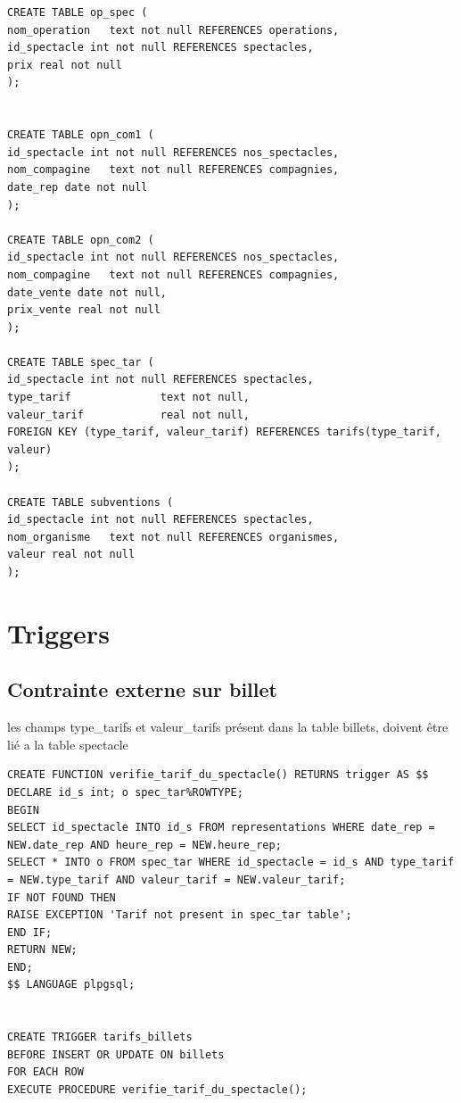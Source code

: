 \documentclass[10pt]{report}
\begin{document}
\begin{lstlisting}
CREATE TABLE op_spec (
nom_operation   text not null REFERENCES operations,
id_spectacle int not null REFERENCES spectacles,
prix real not null
);


CREATE TABLE opn_com1 (
id_spectacle int not null REFERENCES nos_spectacles,
nom_compagine   text not null REFERENCES compagnies,
date_rep date not null
);

CREATE TABLE opn_com2 (
id_spectacle int not null REFERENCES nos_spectacles,
nom_compagine   text not null REFERENCES compagnies,
date_vente date not null,
prix_vente real not null
);

CREATE TABLE spec_tar (
id_spectacle int not null REFERENCES spectacles,
type_tarif	     		text not null,
valeur_tarif    		real not null,
FOREIGN KEY (type_tarif, valeur_tarif) REFERENCES tarifs(type_tarif, valeur)
);

CREATE TABLE subventions (
id_spectacle int not null REFERENCES spectacles,
nom_organisme   text not null REFERENCES organismes,
valeur real not null
);

\end{lstlisting}
\chapter{Triggers}
\section{Contrainte externe sur billet}
les champs type\_tarifs  et valeur\_tarifs présent dans la table billets, doivent être lié a la table spectacle
\begin{lstlisting}
CREATE FUNCTION verifie_tarif_du_spectacle() RETURNS trigger AS $$ 
DECLARE id_s int; o spec_tar%ROWTYPE;
BEGIN
SELECT id_spectacle INTO id_s FROM representations WHERE date_rep = NEW.date_rep AND heure_rep = NEW.heure_rep;
SELECT * INTO o FROM spec_tar WHERE id_spectacle = id_s AND type_tarif = NEW.type_tarif AND valeur_tarif = NEW.valeur_tarif;
IF NOT FOUND THEN 
RAISE EXCEPTION 'Tarif not present in spec_tar table';
END IF;
RETURN NEW;
END; 
$$ LANGUAGE plpgsql;


CREATE TRIGGER tarifs_billets
BEFORE INSERT OR UPDATE ON billets
FOR EACH ROW
EXECUTE PROCEDURE verifie_tarif_du_spectacle();
\end{lstlisting}
\end{document}
